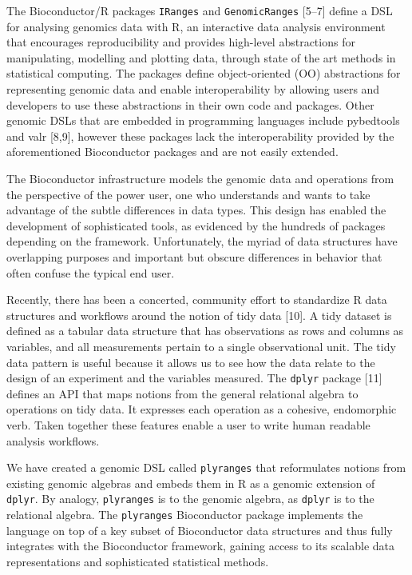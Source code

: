 \documentclass[10pt,letterpaper]{article}
\begin{document}
The Bioconductor/R packages \texttt{IRanges} and \texttt{GenomicRanges}
{[}5--7{]} define a DSL for analysing genomics data with R, an
interactive data analysis environment that encourages reproducibility
and provides high-level abstractions for manipulating, modelling and
plotting data, through state of the art methods in statistical
computing. The packages define object-oriented (OO) abstractions for
representing genomic data and enable interoperability by allowing users
and developers to use these abstractions in their own code and packages.
Other genomic DSLs that are embedded in programming languages include
pybedtools and valr {[}8,9{]}, however these packages lack the
interoperability provided by the aforementioned Bioconductor packages
and are not easily extended.

The Bioconductor infrastructure models the genomic data and operations
from the perspective of the power user, one who understands and wants to
take advantage of the subtle differences in data types. This design has
enabled the development of sophisticated tools, as evidenced by the
hundreds of packages depending on the framework. Unfortunately, the
myriad of data structures have overlapping purposes and important but
obscure differences in behavior that often confuse the typical end user.

Recently, there has been a concerted, community effort to standardize R
data structures and workflows around the notion of tidy data {[}10{]}. A
tidy dataset is defined as a tabular data structure that has
observations as rows and columns as variables, and all measurements
pertain to a single observational unit. The tidy data pattern is useful
because it allows us to see how the data relate to the design of an
experiment and the variables measured. The \texttt{dplyr} package
{[}11{]} defines an API that maps notions from the general relational
algebra to operations on tidy data. It expresses each operation as a
cohesive, endomorphic verb. Taken together these features enable a user
to write human readable analysis workflows.

We have created a genomic DSL called \texttt{plyranges} that
reformulates notions from existing genomic algebras and embeds them in R
as a genomic extension of \texttt{dplyr}. By analogy, \texttt{plyranges}
is to the genomic algebra, as \texttt{dplyr} is to the relational
algebra. The \texttt{plyranges} Bioconductor package implements the
language on top of a key subset of Bioconductor data structures and thus
fully integrates with the Bioconductor framework, gaining access to its
scalable data representations and sophisticated statistical methods.
\end{document}
